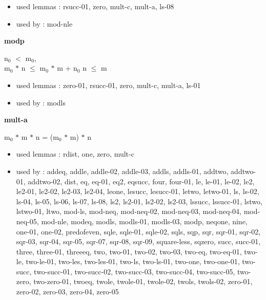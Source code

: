 \documentclass[a4paper]{article}
\begin{document}
\begin{itemize}


\item       used lemmas  : rsucc-01, zero, mult-c, mult-a, ls-08
\item       used by      : mod-nle

\end{itemize}

\medskip

\bigskip

{\large\bf modp}

\medskip

$\mbox{n}_{0}$ $<$ $\mbox{m}_{0}$, \\
$\mbox{m}_{0}$ $*$ n $\le$ $\mbox{m}_{0}$ $*$ m + $\mbox{n}_{0}$ \Fol n $\le$ m

\begin{itemize}


\item       used lemmas  : zero-01, rsucc-01, zero, mult-c, mult-a, ls-01
\item       used by      : modls

\end{itemize}

\medskip

\bigskip

{\large\bf mult-a}

\medskip

 \Fol $\mbox{m}_{0}$ $*$ m $*$ n = ($\mbox{m}_{0}$ $*$ m) $*$ n

\begin{itemize}


\item       used lemmas  : rdist, one, zero, mult-c
\item       used by      : addeq, addle, addle-02, addle-03, addls, addls-01, addtwo, addtwo-01, addtwo-02, dist, eq, eq-01, eq2, eqsucc, four, four-01, le, le-01, le-02, le2, le2-01, le2-02, le2-03, le2-04, leone, lesucc, lesucc-01, letwo, letwo-01, ls, ls-02, ls-04, ls-05, ls-06, ls-07, ls-08, ls2, ls2-01, ls2-02, ls2-03, lssucc, lssucc-01, lstwo, lstwo-01, ltwo, mod-ls, mod-neq, mod-neq-02, mod-neq-03, mod-neq-04, mod-neq-05, mod-nle, modeq, modls, modls-01, modls-03, modp, neqone, nine, one-01, one-02, predofeven, sqle, sqle-01, sqle-02, sqls, sqp, sqr, sqr-01, sqr-02, sqr-03, sqr-04, sqr-05, sqr-07, sqr-08, sqr-09, square-less, sqzero, succ, succ-01, three, three-01, threeeq, two, two-01, two-02, two-03, two-eq, two-eq-01, two-le, two-le-01, two-les, two-les-01, two-ls, two-ls-01, two-one, two-one-01, two-succ, two-succ-01, two-succ-02, two-succ-03, two-succ-04, two-succ-05, two-zero, two-zero-01, twoeq, twole, twole-01, twole-02, twols, twols-02, zero-01, zero-02, zero-03, zero-04, zero-05

\end{itemize}
\end{document}
